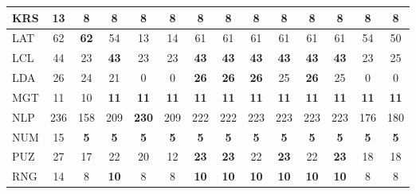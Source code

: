 \begin{longtable}{l|c|c|c|c|c|c|c|c|c|c|c|c|c}
\hline
{\footnotesize KRS} & {\footnotesize 13} & \textbf{8} & \textbf{8} & \textbf{8} & \textbf{8} & \textbf{8} & \textbf{8} & \textbf{8} & \textbf{8} & \textbf{8} & \textbf{8} & \textbf{8} & \textbf{8}\\
\hline
{\footnotesize LAT} & {\footnotesize 62} & \textbf{62} & {\footnotesize 54} & {\footnotesize 13} & {\footnotesize 14} & {\footnotesize 61} & {\footnotesize 61} & {\footnotesize 61} & {\footnotesize 61} & {\footnotesize 61} & {\footnotesize 61} & {\footnotesize 54} & {\footnotesize 50}\\
\hline
{\footnotesize LCL} & {\footnotesize 44} & {\footnotesize 23} & \textbf{43} & {\footnotesize 23} & {\footnotesize 23} & \textbf{43} & \textbf{43} & \textbf{43} & \textbf{43} & \textbf{43} & \textbf{43} & {\footnotesize 23} & {\footnotesize 25}\\
\hline
{\footnotesize LDA} & {\footnotesize 26} & {\footnotesize 24} & {\footnotesize 21} & {\footnotesize 0} & {\footnotesize 0} & \textbf{26} & \textbf{26} & \textbf{26} & {\footnotesize 25} & \textbf{26} & {\footnotesize 25} & {\footnotesize 0} & {\footnotesize 0}\\
\hline
{\footnotesize MGT} & {\footnotesize 11} & {\footnotesize 10} & \textbf{11} & \textbf{11} & \textbf{11} & \textbf{11} & \textbf{11} & \textbf{11} & \textbf{11} & \textbf{11} & \textbf{11} & \textbf{11} & \textbf{11}\\
\hline
{\footnotesize NLP} & {\footnotesize 236} & {\footnotesize 158} & {\footnotesize 209} & \textbf{230} & {\footnotesize 209} & {\footnotesize 222} & {\footnotesize 222} & {\footnotesize 223} & {\footnotesize 223} & {\footnotesize 223} & {\footnotesize 223} & {\footnotesize 176} & {\footnotesize 180}\\
\hline
{\footnotesize NUM} & {\footnotesize 15} & \textbf{5} & \textbf{5} & \textbf{5} & \textbf{5} & \textbf{5} & \textbf{5} & \textbf{5} & \textbf{5} & \textbf{5} & \textbf{5} & \textbf{5} & \textbf{5}\\
\hline
{\footnotesize PUZ} & {\footnotesize 27} & {\footnotesize 17} & {\footnotesize 22} & {\footnotesize 20} & {\footnotesize 12} & \textbf{23} & \textbf{23} & {\footnotesize 22} & \textbf{23} & {\footnotesize 22} & \textbf{23} & {\footnotesize 18} & {\footnotesize 18}\\
\hline
{\footnotesize RNG} & {\footnotesize 14} & {\footnotesize 8} & \textbf{10} & {\footnotesize 8} & {\footnotesize 8} & \textbf{10} & \textbf{10} & \textbf{10} & \textbf{10} & \textbf{10} & \textbf{10} & {\footnotesize 8} & {\footnotesize 8}\\

\end{longtable}
